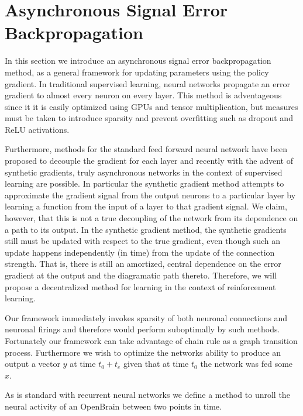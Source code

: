 \section{Asynchronous Signal Error Backpropagation}

In this section we introduce an asynchronous signal error backpropagation method,
as a general framework for updating parameters using the policy gradient. In traditional
supervised learning, neural networks propagate an error gradient to almost every neuron on every layer.
This method is adventageous since it it is easily optimized using GPUs and tensor multiplication, but measures must be 
taken to introduce sparsity and prevent overfitting such as dropout and ReLU activations. 

Furthermore, methods for the standard feed forward neural network have been proposed to decouple the gradient for each layer and recently with the advent of synthetic gradients, truly asynchronous networks in the context of supervised learning are possible. In particular the synthetic gradient method attempts to approximate the gradient signal from the output neurons to a particular layer by learning a function from the input of a layer to that gradient signal. We claim, however, that this is not a true decoupling of the network from its dependence on a path to its output. In the synthetic gradient method, the synthetic gradients still must be updated with respect to the true gradient, even though such an update happens independently (in time) from the update of the connection strength. That is, there is still an amortized, central dependence on the error gradient at the output and the diagramatic path thereto. Therefore, we will propose a decentralized method for learning in the context of reinforcement learning.


Our framework immediately invokes sparsity of both neuronal connections and neuronal firings and therefore would perform suboptimally 
by such methods. Fortunately our framework can take advantage of chain rule as a graph transition process. Furthermore we wish to optimize the networks
ability to produce an output a vector $y$ at time $t_0+t_e$ given that at time $t_0$ the network was fed some $x$.

As is standard with recurrent neural networks we define a method to unroll the neural activity of an OpenBrain between two points in time.

